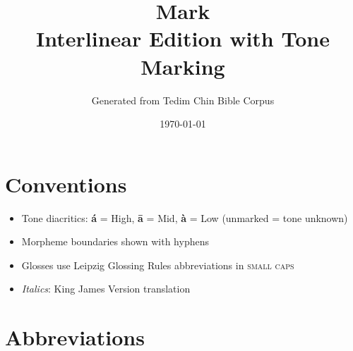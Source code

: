\documentclass[11pt,a4paper]{article}
\title{Mark \\ \large Interlinear Edition with Tone Marking}
\author{Generated from Tedim Chin Bible Corpus}
\date{\today}
\begin{document}
\maketitle

\section*{Conventions}
\begin{itemize}
\item Tone diacritics: \textbf{á} = High, \textbf{ā} = Mid, \textbf{à} = Low (unmarked = tone unknown)
\item Morpheme boundaries shown with hyphens
\item Glosses use Leipzig Glossing Rules abbreviations in \textsc{small caps}
\item \textcolor{kjvcolor}{\textit{Italics}}: King James Version translation
\end{itemize}

\tableofcontents
\newpage

\section*{Abbreviations}
\end{document}
